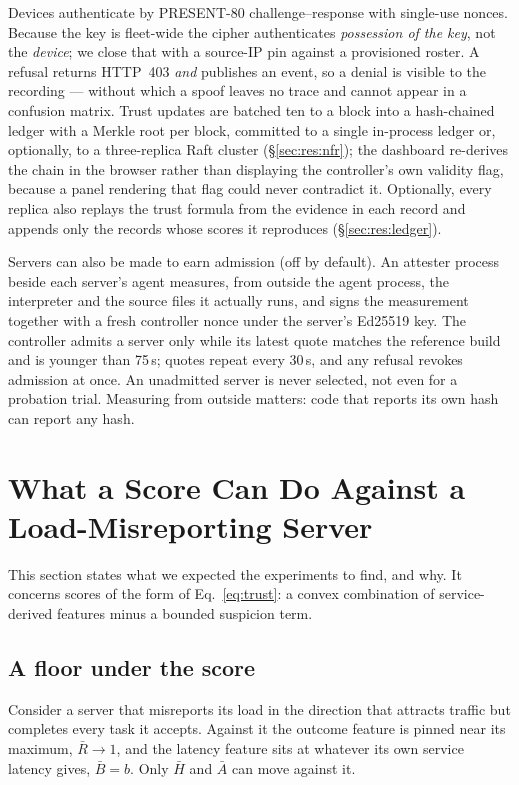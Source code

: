 \documentclass[10pt,twocolumn,letterpaper]{article}
\newcommand{\Agate}{\bar{A}}
\begin{document}
Devices authenticate by PRESENT-80 challenge--response with single-use nonces.
Because the key is fleet-wide the cipher authenticates \emph{possession of the
key}, not the \emph{device}; we close that with a source-IP pin against a
provisioned roster. A refusal returns HTTP~403 \emph{and} publishes an event,
so a denial is visible to the recording --- without which a spoof leaves no
trace and cannot appear in a confusion matrix. Trust updates are batched ten to
a block into a hash-chained ledger with a Merkle root per block, committed to a
single in-process ledger or, optionally, to a three-replica Raft cluster
(\S\ref{sec:res:nfr}); the dashboard
re-derives the chain in the browser rather than displaying the controller's own
validity flag, because a panel rendering that flag could never contradict it. Optionally, every replica also replays the trust
formula from the evidence in each record and appends only the records whose
scores it reproduces (\S\ref{sec:res:ledger}).

Servers can also be made to earn admission (off by default). An attester
process beside each server's agent measures, from outside the agent process,
the interpreter and the source files it actually runs, and signs the
measurement together with a fresh controller nonce under the server's
Ed25519 key. The controller admits a server only while its latest quote
matches the reference build and is younger than 75\,s; quotes repeat every
30\,s, and any refusal revokes admission at once. An unadmitted server is
never selected, not even for a probation trial. Measuring from outside matters:
code that reports its own hash can report any hash.

\section{What a Score Can Do Against a Load-Misreporting Server}
\label{sec:analysis}

This section states what we expected the experiments to find, and why. It
concerns scores of the form of Eq.~\ref{eq:trust}: a convex combination of
service-derived features minus a bounded suspicion term.

\subsection{A floor under the score}
Consider a server that misreports its load in the direction that attracts
traffic but completes every task it accepts. Against it the outcome feature is
pinned near its maximum, $\bar{R} \to 1$, and the latency feature sits at
whatever its own service latency gives, $\bar{B} = b$. Only $\bar{H}$ and
$\Agate$ can move against it.
\end{document}
